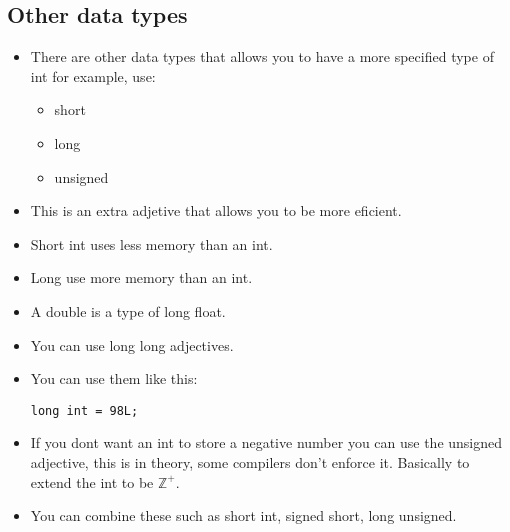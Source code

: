 \subsection{Other data types}
\begin{itemize}
    \item There are other data types that allows you to have a more specified type of int for example, use:
        \begin{itemize}
            \item short
            \item long
            \item unsigned
        \end{itemize}
    
    \item This is an extra adjetive that allows you to be more eficient.
    \item Short int uses less memory than an int.
    \item Long use more memory than an int.
    \item A double is a type of long float.
    \item You can use long long adjectives.
    \item You can use them like this:
        \begin{Verbatim}[breaklines=true, breakanywhere=true]
            long int = 98L; 
        \end{Verbatim}
    
    \item If you dont want an int to store a negative number you can use the unsigned adjective, this is in theory, some compilers don't enforce it. Basically to extend the int to be $\mathbb{Z}^{+}$.
    \item You can combine these such as short int, signed short, long unsigned.

\end{itemize}
